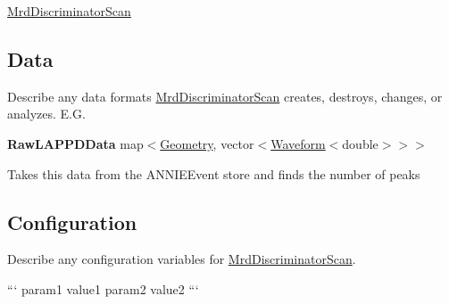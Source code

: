 \hyperlink{classMrdDiscriminatorScan}{Mrd\-Discriminator\-Scan}

\subsection*{Data}

Describe any data formats \hyperlink{classMrdDiscriminatorScan}{Mrd\-Discriminator\-Scan} creates, destroys, changes, or analyzes. E.\-G.

{\bfseries Raw\-L\-A\-P\-P\-D\-Data} {\ttfamily map$<$\hyperlink{classGeometry}{Geometry}, vector$<$\hyperlink{classWaveform}{Waveform}$<$double$>$$>$$>$}
\begin{DoxyItemize}
\item Takes this data from the {\ttfamily A\-N\-N\-I\-E\-Event} store and finds the number of peaks
\end{DoxyItemize}

\subsection*{Configuration}

Describe any configuration variables for \hyperlink{classMrdDiscriminatorScan}{Mrd\-Discriminator\-Scan}.

``` param1 value1 param2 value2 ``` 